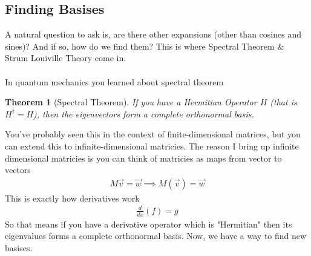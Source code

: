 \documentclass[12pt,fleqn]{article}
\numberwithin{equation}{section} %
\newtheorem{theorem}{Theorem}
\begin{document}
\subsection{Finding Basises}
A natural question to ask is, are there other expansions (other than cosines and sines)? And if so, how do we find them? This is where Spectral Theorem \& Strum Louiville Theory come in.
\\
\\
In quantum mechanics you learned about spectral theorem
\begin{theorem}
	[Spectral Theorem] If you have a Hermitian Operator $H$ (that is $H^\dagger = H$), then the eigenvectors form a complete orthonormal basis.
\end{theorem}
You've probably seen this in the context of finite-dimensional matrices, but you can extend this to infinite-dimensional matricies. The reason I bring up infinite dimensional matricies is you can think of matricies as maps from vector to vectors
\begin{align}
	M \vec v = \vec w \implies M(\vec v) = \vec w
\end{align}
This is exactly how derivatives work
\begin{align}
	\frac{d}{dx} (f) = g
\end{align}
So that means if you have a derivative operator which is "Hermitian" then its eigenvalues forms a complete orthonormal basis. Now, we have a way to find new basises.
\end{document}
